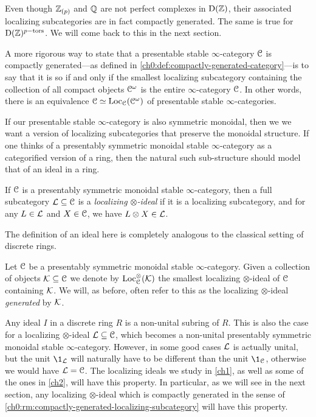 \begin{example}
    Even though $\mathbb{Z}_{(p)}$ and $\mathbb{Q}$ are not perfect complexes in $\mathrm{D}(\mathbb{Z})$, their associated localizing subcategories are in fact compactly generated. The same is true for $\mathrm{D}(\mathbb{Z})^{p-\mathrm{tors}}$. We will come back to this in the next section. 
\end{example}

\begin{remark}
    A more rigorous way to state that a presentable stable $\infty$-category $\EuScript{C}$ is compactly generated---as defined in \cref{ch0:def:compactly-generated-category}---is to say that it is so if and only if the smallest localizing subcategory containing the collection of all compact objects $\EuScript{C}^\omega$ is the entire $\infty$-category $\EuScript{C}$. In other words, there is an equivalence $\EuScript{C}\simeq \operatorname{Loc}_{\EuScript{C}}(\EuScript{C}^\omega)$ of presentable stable $\infty$-categories. 
\end{remark}

If our presentable stable $\infty$-category is also symmetric monoidal, then we we want a version of localizing subcategories that preserve the monoidal structure. If one thinks of a presentably symmetric monoidal stable $\infty$-category as a categorified version of a ring, then the natural such sub-structure should model that of an ideal in a ring. 

\begin{definition}
    \label{ch0:def:localizing-ideal}
    If $\EuScript{C}$ is a presentably symmetric monoidal stable $\infty$-category, then a full subcategory $\mathcal{L}\subseteq \EuScript{C}$ is a \emph{localizing $\otimes$-ideal} if it is a localizing subcategory, and for any $L\in \mathcal{L}$ and $X\in \EuScript{C}$, we have $L\otimes X\in \mathcal{L}$. 
\end{definition}

The definition of an ideal here is completely analogous to the classical setting of discrete rings. 

\begin{definition}
    Let $\EuScript{C}$ be a presentably symmetric monoidal stable $\infty$-category. Given a collection of objects $\mathcal{K}\subseteq \EuScript{C}$ we denote by $\operatorname{Loc}_{\EuScript{C}}^\otimes(\mathcal{K})$ the smallest localizing $\otimes$-ideal of $\EuScript{C}$ containing $\mathcal{K}$. We will, as before, often refer to this as the localizing $\otimes$-ideal \emph{generated} by $\mathcal{K}$. 
\end{definition}

Any ideal $I$ in a discrete ring $R$ is a non-unital subring of $R$. This is also the case for a localizing $\otimes$-ideal $\mathcal{L}\subseteq \EuScript{C}$, which becomes a non-unital presentably symmetric monoidal stable $\infty$-category. However, in some good cases $\mathcal{L}$ is actually unital, but the unit $\1_\L$ will naturally have to be different than the unit $\1_\C$, otherwise we would have $\mathcal{L}=\EuScript{C}$. The localizing ideals we study in \cref{ch1}, as well as some of the ones in \cref{ch2}, will have this property. In particular, as we will see in the next section, any localizing $\otimes$-ideal which is compactly generated in the sense of \cref{ch0:rm:compactly-generated-localizing-subcategory} will have this property.

